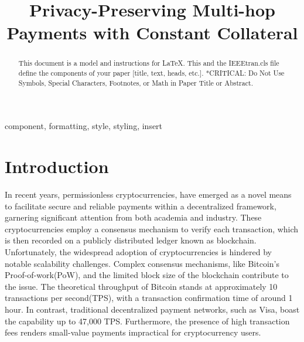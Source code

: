 \documentclass[conference]{IEEEtran}
\begin{document}
\title{Privacy-Preserving Multi-hop Payments with Constant Collateral}

\author{
\and
{}
}

\maketitle

\begin{abstract}
This document is a model and instructions for \LaTeX.
This and the IEEEtran.cls file define the components of your paper [title, text, heads, etc.]. *CRITICAL: Do Not Use Symbols, Special Characters, Footnotes, 
or Math in Paper Title or Abstract.
\end{abstract}

\begin{IEEEkeywords}
component, formatting, style, styling, insert
\end{IEEEkeywords}

\section{Introduction}
In recent years, permissionless cryptocurrencies, have emerged as a novel means to facilitate secure
and reliable payments within a decentralized framework, garnering significant attention from both academia and industry. These cryptocurrencies employ a consensus mechanism to verify each transaction, which is
then recorded on a publicly distributed ledger known as blockchain. Unfortunately, 
the widespread adoption of cryptocurrencies is hindered by notable scalability challenges. Complex consensus mechanisms, like Bitcoin's Proof-of-work(PoW), and the limited block size of the blockchain contribute to the issue. The theoretical throughput of Bitcoin stands at approximately 10 transactions per second(TPS), with a transaction confirmation time of around 1 hour. In contrast, traditional decentralized payment networks, such as Visa, boast the capability up to 47,000 TPS. Furthermore, the presence of high transaction fees renders small-value payments impractical for cryptocurrency users. 
\end{document}
